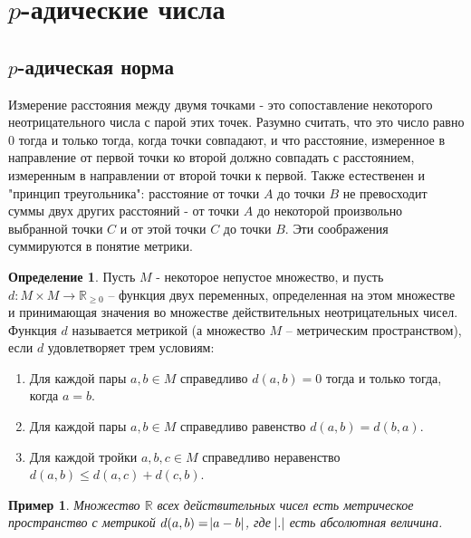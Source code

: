 \documentclass[master, och, diploma, times]{sty/SCWorks}
\theoremstyle{plain}
\newtheorem{exmp}{Пример}[section]
\theoremstyle{definition}
\newtheorem{defn}{Определение}[section]
\numberwithin{equation}{section}
\begin{document}
\section{$p$-адические числа}

\subsection{$p$-адическая норма}

Измерение расстояния между двумя точками - это сопоставление некоторого неотрицательного числа с парой этих точек. Разумно считать, что это число равно $0$ тогда и только тогда, когда точки совпадают, и что расстояние, измеренное в направление от первой точки ко второй должно совпадать с расстоянием, измеренным в направлении от второй точки к первой. Также естественен и "принцип треугольника":  расстояние от точки $A$ до точки $B$ не превосходит суммы двух других расстояний - от точки $A$ до некоторой произвольно выбранной точки $C$ и от этой точки $C$ до точки $B$. Эти соображения суммируются в понятие метрики.

\begin{defn}
Пусть $M$ - некоторое непустое множество, и пусть \linebreak ${d: M \times M \rightarrow \mathbb {R}_{\ge0}}$ -- функция двух переменных, определенная на этом множестве и принимающая значения во множестве действительных неотрицательных чисел. Функция $d$ называется метрикой (а множество $M$ -- метрическим пространством), если $d$ удовлетворяет трем условиям:

\begin{enumerate} 
	\item Для каждой пары $a, b \in M$ справедливо $d(a, b)=0$ тогда и только тогда, когда $a=b$.
	\item Для каждой пары $a, b \in M$ справедливо равенство $d(a, b) = d(b, a)$.
	\item Для каждой тройки $a, b, c \in M$ справедливо неравенство $d(a, b) \le d(a, c) + d(c, b)$.
\end{enumerate}
\end{defn}

\begin{exmp}
Множество $\mathbb {R}$ всех действительных чисел есть метрическое пространство с метрикой $d(a, b)= \abs{a-b}$, где $\abs{.}$ есть абсолютная величина.
\end{exmp}
\end{document}
